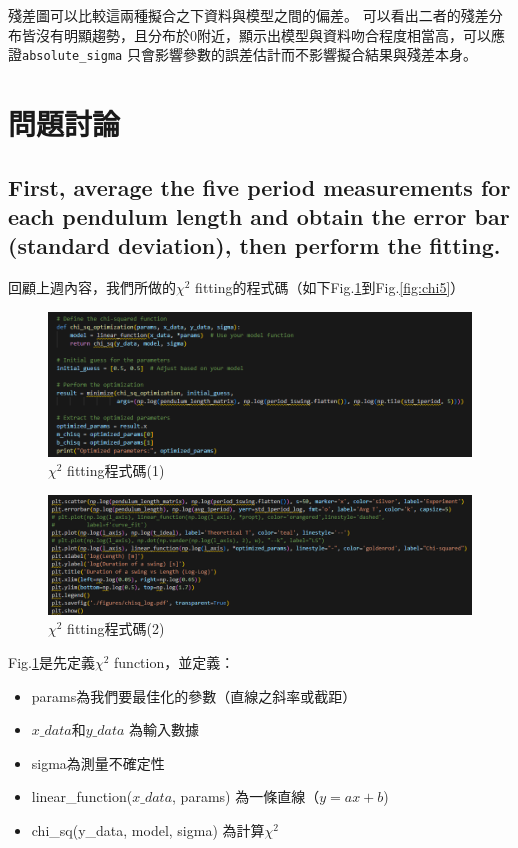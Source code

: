 \documentclass[12pt,a4paper]{article}
\begin{document}
\begin{CJK}{UTF8}{bkai}
殘差圖可以比較這兩種擬合之下資料與模型之間的偏差。
可以看出二者的殘差分布皆沒有明顯趨勢，且分布於0附近，顯示出模型與資料吻合程度相當高，可以應證\texttt{absolute\_sigma} 只會影響參數的誤差估計而不影響擬合結果與殘差本身。

\section{問題討論}

\subsection{First, average the five period measurements for each pendulum length and obtain the error bar (standard deviation), then perform the fitting.}
\hfill

回顧上週內容，我們所做的$\chi ^2$ fitting的程式碼（如下Fig.\ref{fig:chi1}到Fig.\ref{fig:chi5}）

\begin{figure}[h]
    \centering
    \includegraphics[width=1\linewidth]{chi1.png}
    \caption{$\chi ^2$ fitting程式碼(1)}
    \label{fig:chi1}
\end{figure}

\clearpage

\begin{figure}[h]
    \centering
    \includegraphics[width=1\linewidth]{chi2.png}
    \caption{$\chi ^2$ fitting程式碼(2)}
    \label{fig:chi2}
\end{figure}


Fig.\ref{fig:chi1}是先定義$\chi ^2$ function，並定義：
\begin{itemize}
    \item params為我們要最佳化的參數（直線之斜率或截距）
    \item $x\_data$和$y\_data$ 為輸入數據
    \item sigma為測量不確定性
    \item linear\_function($x\_data$, \*params) 為一條直線（$y=ax+b$)
    \item chi\_sq(y\_data, model, sigma) 為計算$\chi^2$
\end{itemize}



\end{CJK}
\end{document}
